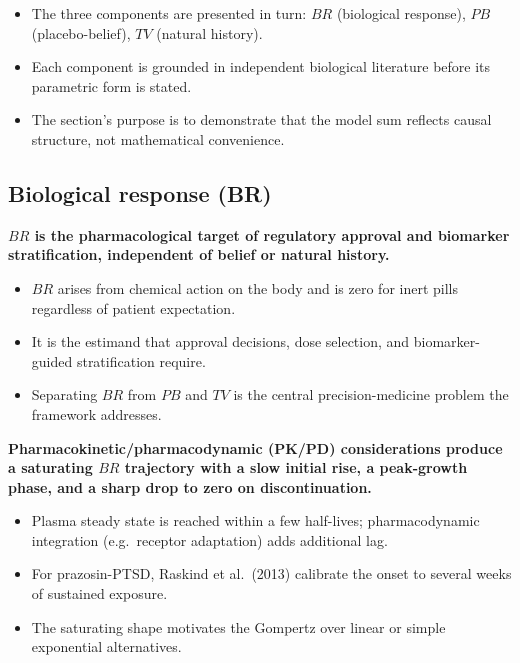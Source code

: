 \documentclass[
  11pt,
]{article}
\begin{document}
\begin{itemize}\setlength{\itemsep}{2pt}\setlength{\parskip}{0pt}
\item The three components are presented in turn: $BR$ (biological response), $PB$ (placebo-belief), $TV$ (natural history).
\item Each component is grounded in independent biological literature before its parametric form is stated.
\item The section's purpose is to demonstrate that the model sum reflects causal structure, not mathematical convenience.
\end{itemize}

\subsection{Biological response (BR)}\label{biological-response-br}

\textbf{$BR$ is the pharmacological target of regulatory approval and biomarker stratification, independent of belief or natural history.}

\begin{itemize}\setlength{\itemsep}{2pt}\setlength{\parskip}{0pt}
\item $BR$ arises from chemical action on the body and is zero for inert pills regardless of patient expectation.
\item It is the estimand that approval decisions, dose selection, and biomarker-guided stratification require.
\item Separating $BR$ from $PB$ and $TV$ is the central precision-medicine problem the framework addresses.
\end{itemize}

\textbf{Pharmacokinetic/pharmacodynamic (PK/PD) considerations produce a saturating $BR$ trajectory with a slow initial rise, a peak-growth phase, and a sharp drop to zero on discontinuation.}

\begin{itemize}\setlength{\itemsep}{2pt}\setlength{\parskip}{0pt}
\item Plasma steady state is reached within a few half-lives; pharmacodynamic integration (e.g.\ receptor adaptation) adds additional lag.
\item For prazosin-PTSD, Raskind et al.\ (2013) calibrate the onset to several weeks of sustained exposure.
\item The saturating shape motivates the Gompertz over linear or simple exponential alternatives.
\end{itemize}
\end{document}
